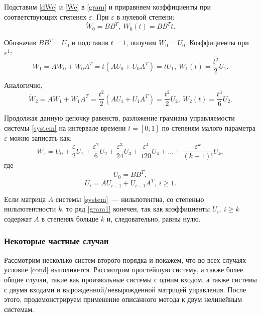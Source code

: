 \documentclass[../main.tex]{subfiles}
\begin{document}
 Подставим \eqref{dWe} и \eqref{We} в \eqref{gram} и приравняем коэффициенты при соответствующих степенях $ \varepsilon $. При $ \varepsilon $ в нулевой степени:
 \begin{equation*}
	 \dot{W}_0 = B B ^T,  \ W_0(t) = B B ^Tt.
 \end{equation*}
 
 Обозначив $ B B^T = U_0 $ и подставив $ t = 1$, получим $ W_0 = U_0$. Коэффициенты при $ \varepsilon ^ 1$:
 \begin{equation*}
	 \dot{W}_1 = A W_0 + W_0 A^T = t \left( A U_0 + U_0 A^T \right) = t U_1 ,  \ W_1(t) = \frac{t^2}{2}U_1.
 \end{equation*}
 
 Аналогично,
 \begin{equation*}
	 \dot{W}_2 = A W_1 + W_1 A^T = \dfrac{t^2}{2} \left( A U_1 + U_1 A^T \right) = \dfrac{t^2}{2} U_2 ,  \ W_2(t) = \dfrac{t^3}{6}U_2.
 \end{equation*}
 
 Продолжая данную цепочку равенств, разложение грамиана управляемости системы \eqref{system} на интервале времени $t = [0;1] $ по степеням малого параметра $ \varepsilon $ можно записать как:
 \begin{equation}\label{gram1}
	 W_{\varepsilon} = U_0 + \dfrac{\varepsilon}{2}U_1 + \dfrac{\varepsilon^2}{6} U_2 + \dfrac{\varepsilon^3}{24}U_3 + \dfrac{\varepsilon^4}{120}U_4 + \dots + \dfrac{\varepsilon^k}{(k+1)!}U_k,
 \end{equation}
 где
 \begin{equation*}
	 U_0 = B B^T,
 \end{equation*}
 \begin{equation*}
	 U_i  = A U_{i-1} + U_{i-1} A^T, \ i \geq 1.
 \end{equation*}
 
 Если матрица $ A $ системы \eqref{system}~--- нильпотентна, со степенью нильпотентности $ k $, то ряд \eqref{gram1} конечен, так как коэффициенты $ U_i, \ i \geq k$ содержат $ A $ в степенях больше $ k$ и, следовательно, равны нулю.  
 \subsubsection{Некоторые частные случаи}
 Рассмотрим несколько систем второго порядка и покажем, что во всех случаях условие \eqref{cond} выполняется. Рассмотрим простейшую систему, а также более общие случаи, такие как произвольные системы с одним входом, а также системы с двумя входами и вырожденной/невырожденной матрицей управления. После этого, продемонстрируем применение описанного метода к двум нелинейным системам.
\end{document}
